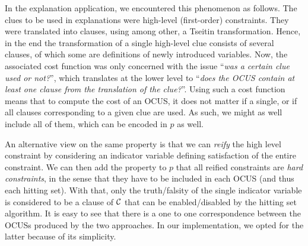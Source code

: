 In the explanation application, we encountered this phenomenon as follows. 
The clues to be used in explanations were high-level (first-order) constraints. They were translated into clauses, using among other, a Tseitin transformation.
Hence, in the end the transformation of a single high-level clue consists of several clauses, of which some are definitions of newly introduced variables. 
Now, the associated cost function was only concerned with the issue ``\emph{was a certain clue used or not?}'', which translates at the lower level to ``\emph{does the OCUS contain at least one clause from the translation of the clue?}''.
Using such a cost function means that to compute the cost of an OCUS, it does not matter if a single, or if all clauses corresponding to a given clue are used. As such, we might as well include all of them, which can be encoded in $p$ as well.  

An alternative view on the same property is that we can \emph{reify} the high level constraint by considering an indicator variable defining satisfaction of the entire constraint. 
We can then add the property to $p$ that all reified constraints are \emph{hard constraints}, in the sense that they have to be included in each OCUS (and thus each hitting set). With that, only the truth/falsity of the single indicator variable is considered to be a clause of $\mathcal{C} $ that can be enabled/disabled by the hitting set algorithm. 
It is easy to see that there is a one to one correspondence between the OCUSs produced by the two approaches. In our implementation, we opted for the latter because of its simplicity. 



